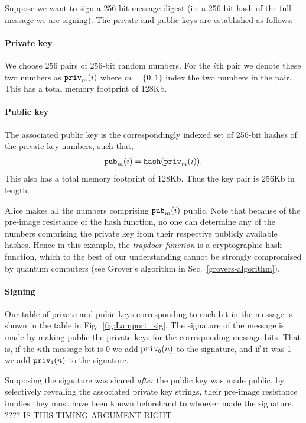 Suppose we want to sign a 256-bit message digest (i.e a 256-bit hash of the full message we are signing). The private and public keys are established as follows:

\paragraph{Private key}

We choose 256 pairs of 256-bit random numbers. For the $i$th pair we denote these two numbers as ${\tt priv}_m(i)$ where $m=\{0,1\}$ index the two numbers in the pair. This has a total memory footprint of 128Kb.

\paragraph{Public key}

The associated public key is the correspondingly indexed set of 256-bit hashes of the private key numbers, such that,
\begin{align}
	{\tt pub}_m(i) = {\tt hash}({\tt priv}_m(i)).
\end{align}
This also has a total memory footprint of 128Kb. Thus the key pair is 256Kb in length.

Alice makes all the numbers comprising ${\tt pub}_m(i)$ public. Note that because of the pre-image resistance of the hash function, no one can determine any of the numbers comprising the private key from their respective publicly available hashes. Hence in this example, the \emph{trapdoor function} is a cryptographic hash function, which to the best of our understanding cannot be strongly compromised by quantum computers (see Grover's algorithm in Sec.~\ref{grovers-algorithm}).

\paragraph{Signing}

Our table of private and pubic keys corresponding to each bit in the message is shown in the table in Fig.~\ref{fig:Lamport_sig}. The signature of the message is made by making public the private keys for the corresponding message bits. That is, if the $n\mathrm{th}$ message bit is 0 we add ${\tt priv_0}(n)$ to the signature, and if it was 1 we add ${\tt priv_1}(n)$ to the signature. %

Supposing the signature was shared \emph{after} the public key was made public, by selectively revealing the associated private key strings, their pre-image resistance implies they must have been known beforehand to whoever made the signature. ???? IS THIS TIMING ARGUMENT RIGHT

